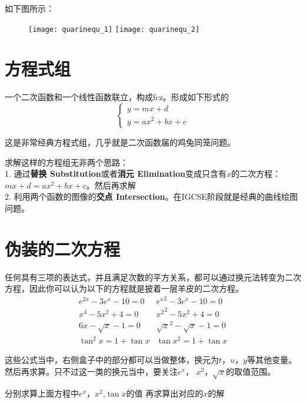 如下图所示：
\begin{figure}[H]
\centering
\texttt{[image: quarinequ\_1]}
\texttt{[image: quarinequ\_2]}
\end{figure}

\clearpage

\section{方程式组}
\label{sec:System from Linear and Quadratic Function}
一个二次函数和一个线性函数联立，构成\gls{fcz}。形成如下形式的
\[
\left\{\begin{matrix}
 y=mx+d\\
y=ax^2+bx+c
\end{matrix}\right.
\]

这是非常经典方程式组，几乎就是二次函数届的鸡兔同笼问题。

求解这样的方程组无非两个思路：\\
1. 通过\textbf{替换 Substitution}或者\textbf{消元 Elimination}变成只含有$x$的二次方程：$mx+d=ax^2+bx+c$。然后再求解\\
2. 利用两个函数的图像的\textbf{交点 Intersection}。在IGCSE阶段就是经典的曲线绘图问题。
\clearpage


\section{伪装的二次方程}
\label{sec:Qudratic Equation in Disguise}

任何具有三项的表达式，并且满足次数的平方关系，都可以通过换元法转变为二次方程，因此你可以认为以下的方程就是披着一层羊皮的二次方程。
\[
\begin{matrix} %
e^{2x}-3e^x-10=0  & \boxed{e^x}^2-3\boxed{e^x}-10=0\\
x^4-5x^2+4=0      & \boxed{x^2}^2-5\boxed{x^2}+4=0\\
6x-\sqrt{x}-1=0   & \boxed{\sqrt{x}}^2-\boxed{\sqrt{x}}-1=0\\
\tan^2 x=1+\tan x & \boxed{\tan x}^2=1+\boxed{\tan x}
\end{matrix}
\]

这些公式当中，右侧盒子中的部分都可以当做整体，换元为$t$，$u$，$y$等其他变量。然后再求算。只不过这一类的换元当中，要关注$e^x$， $x^2$，$\sqrt{x}$的取值范围。

\begin{TaskBox}
分别求算上面方程中$e^x$，$x^2$,$\tan x$的值
\tcblower
再求算出对应的$x$的解
\end{TaskBox}

